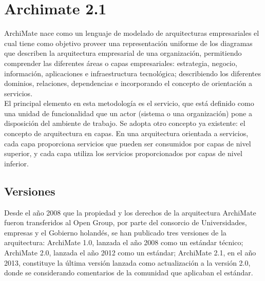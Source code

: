 \section{Archimate 2.1}
ArchiMate nace como un lenguaje de modelado de arquitecturas empresariales el cual tiene como objetivo proveer una representación uniforme de los diagramas que describen la arquitectura empresarial de una organización, permitiendo comprender las diferentes áreas o capas empresariales: estrategia, negocio, información, aplicaciones e infraestructura tecnológica; describiendo los diferentes dominios, relaciones, dependencias e incorporando el concepto de orientación a servicios. \\

El principal elemento en esta metodología es el servicio, que está definido como una unidad de funcionalidad que un actor (sistema o una organización) pone a disposición del ambiente de trabajo. Se adopta otro concepto ya existente: el concepto de arquitectura en capas. En una arquitectura orientada a servicios, cada capa proporciona servicios que pueden ser consumidos por capas de nivel superior, y cada capa utiliza los servicios proporcionados por capas de nivel inferior. \\
  
  \subsection{Versiones}
  Desde el año 2008 que la propiedad y los derechos de la arquitectura ArchiMate fueron transferidos al Open Group, por parte del consorcio de Universidades, empresas y el Gobierno holandés, se han publicado tres versiones de la arquitectura: ArchiMate 1.0, lanzada el año 2008 como un estándar técnico; ArchiMate 2.0, lanzada el año 2012 como un estándar; ArchiMate 2.1, en el año 2013, constituye la última versión lanzada como actualización a la versión 2.0, donde se considerando comentarios de la comunidad que aplicaban el estándar. \\
  
